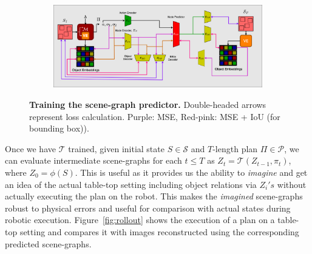 \begin{figure}
    \begin{subfigure}{1.0\hsize}
         \centering    
         \includegraphics[width=\textwidth]{figures/sgp-7.png}
    \end{subfigure}
    \caption{\textbf{Training the scene-graph predictor. }Double-headed arrows represent loss calculation. Purple: MSE, Red-pink: MSE + IoU (for bounding box)). 
    }
    \label{fig:sgp}
\end{figure}

Once we have $\mathcal{T}$ trained, given initial state $S \in \mathcal{S}$ and $T$-length plan $\Pi \in \mathcal{P}$, we can evaluate intermediate scene-graphs for each $t \leq T$ as $Z_t = \mathcal{T}(Z_{t-1}, \pi_t)$, where $Z_0 = \phi(S)$. This is useful as it provides us the ability to \textit{imagine} and get an idea of the actual table-top setting including object relations via $Z_i's$ without actually executing the plan on the robot. This makes the \textit{imagined} scene-graphs robust to physical errors and useful for comparison with actual states during robotic execution. Figure~\ref{fig:rollout} shows the execution of a plan on a table-top setting and compares it with images reconstructed using the corresponding predicted scene-graphs.

